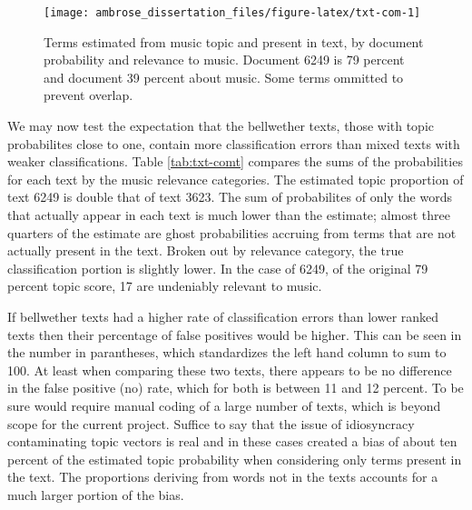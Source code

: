 \documentclass[]{book}
\theoremstyle{definition}
\theoremstyle{definition}
\theoremstyle{definition}
\theoremstyle{remark}
\begin{document}
\begin{figure}

{\centering \texttt{[image: ambrose\_dissertation\_files/figure-latex/txt-com-1]} 

}

\caption{Terms estimated from music topic and present in text, by document probability and relevance to music. Document 6249 is 79 percent and document 39 percent about music. Some terms ommitted to prevent overlap.}\label{fig:txt-com}
\end{figure}

We may now test the expectation that the bellwether texts, those with
topic probabilites close to one, contain more classification errors than
mixed texts with weaker classifications. Table \ref{tab:txt-comt}
compares the sums of the probabilities for each text by the music
relevance categories. The estimated topic proportion of text 6249 is
double that of text 3623. The sum of probabilites of only the words that
actually appear in each text is much lower than the estimate; almost
three quarters of the estimate are ghost probabilities accruing from
terms that are not actually present in the text. Broken out by relevance
category, the true classification portion is slightly lower. In the case
of 6249, of the original 79 percent topic score, 17 are undeniably
relevant to music.

If bellwether texts had a higher rate of classification errors than
lower ranked texts then their percentage of false positives would be
higher. This can be seen in the number in parantheses, which
standardizes the left hand column to sum to 100. At least when comparing
these two texts, there appears to be no difference in the false positive
(no) rate, which for both is between 11 and 12 percent. To be sure would
require manual coding of a large number of texts, which is beyond scope
for the current project. Suffice to say that the issue of idiosyncracy
contaminating topic vectors is real and in these cases created a bias of
about ten percent of the estimated topic probability when considering
only terms present in the text. The proportions deriving from words not
in the texts accounts for a much larger portion of the bias.
\end{document}
